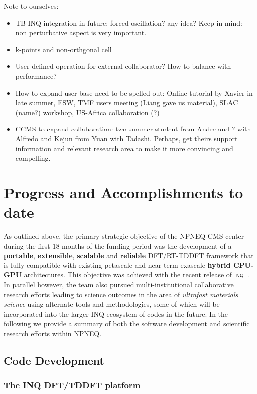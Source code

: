 {\color{green}
Note to ourselves:
\begin{itemize}
    \item TB-INQ integration in future: forced oscillation? any idea? Keep in mind: non perturbative aspect is very important.
    \item k-points and non-orthgonal cell
    \item User defined operation for external collaborator? How to balance with performance?
    \item How to expand user base need to be spelled out: Online tutorial by Xavier in late summer, ESW, TMF users meeting (Liang gave us material), SLAC (name?) workshop, US-Africa collaboration (?)
    \item CCMS to expand collaboration: two summer student from Andre and ? with Alfredo and Kejun from Yuan with Tadashi. Perhaps, get theirs support information and relevant research area to make it more convincing and compelling.
\end{itemize}

}
\clearpage

\section{Progress and Accomplishments to date}

As outlined above, the primary strategic objective of the NPNEQ CMS center during the first 18 months of the funding period was the development of a \textbf{portable}, \textbf{extensible}, \textbf{scalable} and \textbf{reliable} DFT/RT-TDDFT framework that is fully compatible with existing petascale and near-term exascale \textbf{hybrid CPU-GPU} architectures.
This objective was achieved with the recent release of \textsc{inq}~\cite{Andrade2021}. 
In parallel however, the team also pursued multi-institutional collaborative research efforts leading to science outcomes in the area of \emph{ultrafast materials science} using alternate tools and methodologies, some of which will be incorporated into the larger INQ ecosystem of codes in the future. 
In the following we provide a summary of both the software development and scientific research efforts within NPNEQ.

\subsection{Code Development}

\subsubsection{The INQ DFT/TDDFT platform} 

